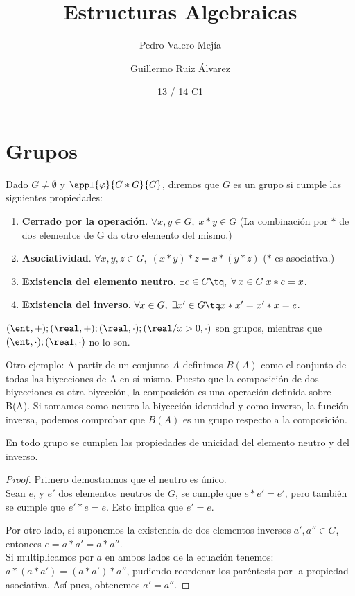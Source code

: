 \documentclass[nochap]{apuntes}
\title{Estructuras Algebraicas}
\author{Pedro Valero Mejía \and Guillermo Ruiz Álvarez}
\date{13 / 14 C1}
\begin{document}
\pagestyle{plain}
\maketitle
\tableofcontents
\newpage

\section{Grupos}

\begin{defn}[Grupo]
Dado $G\neq \emptyset$  y $\appl{\varphi}{G\ast G}{G}$, diremos que $G$ es un grupo si cumple las siguientes propiedades:
\begin{enumerate}
\item \textbf{Cerrado por la operación}. $\forall x, y \in G, \; x \ast y \in G$  (La combinación por $\ast$  de dos elementos de G da otro elemento del mismo.)
\item \textbf{Asociatividad}. $\forall x, y, z \in G, \; (x \ast y) \ast z = x \ast (y \ast z)$ ($\ast$ es asociativa.)
\item \textbf{Existencia del elemento neutro}. $\exists  e \in G \tq ,\; \forall\, x\in G\; x\ast e=x$.
\item \textbf{Existencia del inverso}. $\forall x \in G ,\; \exists x' \in G \tq x\ast x'=x'\ast x=e$.
\end{enumerate}
\end{defn}

\begin{example}
  $ (\ent, +); (\real, +); (\real, \cdot); (\real/x>0, \cdot)$ son grupos, mientras que
  $(\ent, \cdot); (\real, \cdot)$ no lo son.

  Otro ejemplo: A partir de un conjunto $A$ definimos $B(A)$ como el conjunto de todas las biyecciones de A en sí mismo.  Puesto que la composición de dos biyecciones es otra biyección, la composición es una operación definida sobre B(A). Si tomamos como neutro la biyección identidad y como inverso, la función inversa, podemos comprobar que $B(A)$ es un grupo respecto a la composición.
\end{example}

\begin{theorem}
  En todo grupo se cumplen las propiedades de unicidad del elemento neutro y del inverso.
\end{theorem}

\begin{proof}
Primero demostramos que el neutro es único. \\
Sean $e$, y $e'$ dos elementos neutros de $G$, se cumple que $e\ast e'=e'$, pero también se cumple que $e'\ast e=e$. Esto implica que $e'=e$.

Por otro lado, si suponemos la existencia de dos elementos inversos $a',a''\in G$, entonces $e=a\ast a'=a\ast a''$. \\
Si multiplicamos por $a$ en ambos lados de la ecuación tenemos: $a\ast (a\ast a')=(a\ast a')\ast a''$, pudiendo reordenar los paréntesis por la
propiedad asociativa. Así pues, obtenemos $a'=a''$.
\end{proof}
\end{document}
